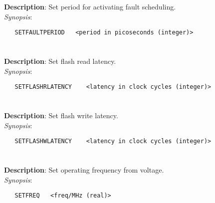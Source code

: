 \section{\quad{}}
\label{manpages:SETFAULTPERIOD}
\label{manpages:setfaultperiod}
\vspace{-0.1in}
{\bf Description}: 	Set period for activating fault scheduling.\\[1.5ex]
{\em Synopsis}:
\vspace{-0.05in}
\scriptsize
\begin{lstlisting}
   SETFAULTPERIOD   <period in picoseconds (integer)>																
\end{lstlisting}
\normalsize
\vspace{-0.05in}


\section{\quad{}}
\label{manpages:SETFLASHRLATENCY}
\label{manpages:setflashrlatency}
\vspace{-0.1in}
{\bf Description}: 	Set flash read latency.\\[1.5ex]
{\em Synopsis}:
\vspace{-0.05in}
\scriptsize
\begin{lstlisting}
   SETFLASHRLATENCY    <latency in clock cycles (integer)>																		
\end{lstlisting}
\normalsize
\vspace{-0.05in}


\section{\quad{}}
\label{manpages:SETFLASHWLATENCY}
\label{manpages:setflashwlatency}
\vspace{-0.1in}
{\bf Description}: 	Set flash write latency.\\[1.5ex]
{\em Synopsis}:
\vspace{-0.05in}
\scriptsize
\begin{lstlisting}
   SETFLASHWLATENCY    <latency in clock cycles (integer)>																		
\end{lstlisting}
\normalsize
\vspace{-0.05in}


\section{\quad{}}
\label{manpages:SETFREQ}
\label{manpages:setfreq}
\vspace{-0.1in}
{\bf Description}: 	Set operating frequency from voltage.\\[1.5ex]
{\em Synopsis}:
\vspace{-0.05in}
\scriptsize
\begin{lstlisting}
   SETFREQ   <freq/MHz (real)>								
\end{lstlisting}
\normalsize
\vspace{-0.05in}


